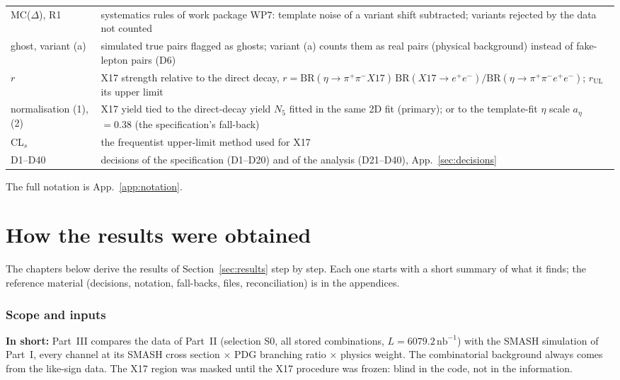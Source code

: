 \documentclass[11pt,a4paper]{article}
\newcommand{\ee}{\ensuremath{e^{+}e^{-}}\xspace}
\newcommand{\pipi}{\ensuremath{\pi^{+}\pi^{-}}\xspace}
\newcommand{\ppee}{\ensuremath{\pi^{+}\pi^{-}e^{+}e^{-}}\xspace}
\newcommand{\nbinv}{\ensuremath{\mathrm{nb}^{-1}}\xspace}
\newcommand{\aEta}{\ensuremath{a_\eta}\xspace}
\newcommand{\BRX}{\ensuremath{\mathrm{BR}(\eta\to\pipi X17)\,\mathrm{BR}(X17\to\ee)}\xspace}
\newcommand{\tipbox}[1]{\par\noindent\colorbox{blue!6}{\parbox{\dimexpr\linewidth-2\fboxsep\relax}{#1}}\par}
\newcommand{\inshort}[1]{\tipbox{\textbf{In short:} #1}}%
\begin{document}
{\begin{longtable}{@{}>{\raggedright\arraybackslash}p{3.3cm} >{\raggedright\arraybackslash}p{\dimexpr\textwidth-3.3cm-2\tabcolsep\relax}@{}}
MC($\Delta$), R1 & systematics rules of work package WP7: template noise of a variant shift subtracted; variants rejected by the data not counted \\
ghost, variant (a) & simulated true pairs flagged as ghosts; variant (a) counts them as real pairs (physical background) instead of fake-lepton
pairs (D6) \\
$r$ & X17 strength relative to the direct decay, $r=\BRX/\mathrm{BR}(\eta\to\ppee)$; $r_{\mathrm{UL}}$ its upper limit \\
normalisation (1), (2) & X17 yield tied to the direct-decay yield $N_5$ fitted in the same 2D fit (primary); or to the template-fit $\eta$ scale
\aEta$=0.38$ (the specification's fall-back) \\
CL$_s$ & the frequentist upper-limit method used for X17 \\
D1--D40 & decisions of the specification (D1--D20) and of the analysis (D21--D40), App.~\ref{sec:decisions} \\
\bottomrule
\end{longtable}}

The full notation is App.~\ref{app:notation}.

\clearpage
\renewcommand{\floatpagefraction}{0.5}
\part*{How the results were obtained}
The chapters below derive the results of Section~\ref{sec:results} step by step. Each one starts with a short summary of what it finds; the reference material (decisions, notation, fall-backs, files, reconciliation) is in the appendices.

\section{Scope and inputs}
\label{sec:scope}
\inshort{Part~III compares the data of Part~II (selection S0, all stored combinations, $L=6079.2\,\nbinv$) with the SMASH simulation of Part~I, every channel at its SMASH cross section $\times$ PDG branching ratio $\times$ physics weight. The combinatorial background always comes from the like-sign data. The X17 region was masked until the X17 procedure was frozen: blind in the code, not in the information.}
\end{document}
